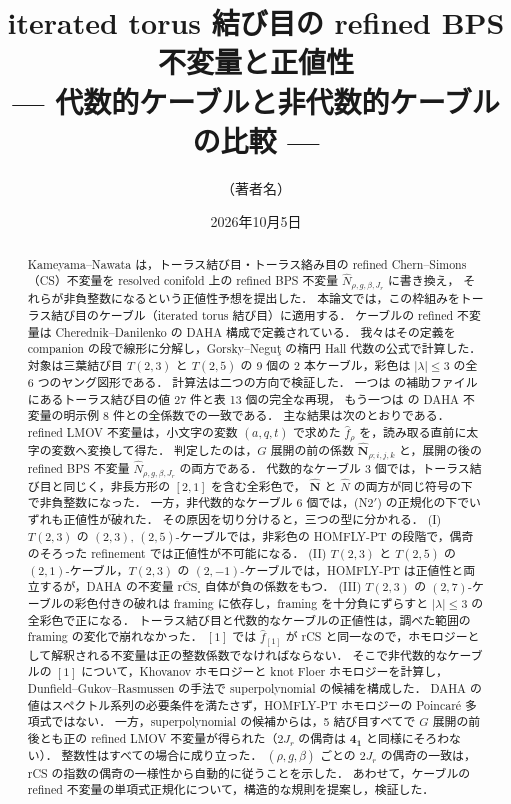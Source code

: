 \documentclass[11pt,a4paper]{ltjsarticle}
\title{iterated torus 結び目の refined BPS 不変量と正値性\\
\large --- 代数的ケーブルと非代数的ケーブルの比較 ---}
\author{（著者名）}
\date{2026年10月5日}
\theoremstyle{definition}
\theoremstyle{remark}
\newcommand{\rCS}{\overline{\mathrm{rCS}}}
\newcommand{\hN}{\widehat{N}}
\newcommand{\hf}{\widehat{f}}
\newcommand{\hbN}{\widehat{\mathbf{N}}}
\begin{document}
\maketitle

\begin{abstract}
Kameyama--Nawata \cite{KN} は，トーラス結び目・トーラス絡み目の refined Chern--Simons（CS）不変量を
resolved conifold 上の refined BPS 不変量 $\hN_{\rho,g,\beta,J_r}$ に書き換え，
それらが非負整数になるという正値性予想を提出した．
本論文では，この枠組みをトーラス結び目のケーブル（iterated torus 結び目）に適用する．
ケーブルの refined 不変量は Cherednik--Danilenko \cite{CD14} の DAHA 構成で定義されている．
我々はその定義を companion の段で線形に分解し，Gorsky--Neguţ \cite{GN} の楕円 Hall 代数の公式で計算した．
対象は三葉結び目 $T(2,3)$ と $T(2,5)$ の 9 個の 2 本ケーブル，彩色は $|\lambda|\le 3$ の全 6 つのヤング図形である．
計算法は二つの方向で検証した．
一つは \cite{KN} の補助ファイルにあるトーラス結び目の値 27 件と表 13 個の完全な再現，
もう一つは \cite{CD14} の DAHA 不変量の明示例 8 件との全係数での一致である．
主な結果は次のとおりである．
refined LMOV 不変量は，小文字の変数 $(a,q,t)$ で求めた $\hf_\rho$ を，読み取る直前に太字の変数へ変換して得た．
判定したのは，$G$ 展開の前の係数 $\hbN_{\rho;i,j,k}$ と，展開の後の refined BPS 不変量 $\hN_{\rho,g,\beta,J_r}$ の両方である．
代数的なケーブル 3 個では，トーラス結び目と同じく，非長方形の $[2,1]$ を含む全彩色で，
$\hbN$ と $\hN$ の両方が同じ符号の下で非負整数になった．
一方，非代数的なケーブル 6 個では，(N2$'$) の正規化の下でいずれも正値性が破れた．
その原因を切り分けると，三つの型に分かれる．
(I) $T(2,3)$ の $(2,3)$, $(2,5)$-ケーブルでは，非彩色の HOMFLY-PT の段階で，偶奇のそろった refinement では正値性が不可能になる．
(II) $T(2,3)$ と $T(2,5)$ の $(2,1)$-ケーブル，$T(2,3)$ の $(2,-1)$-ケーブルでは，HOMFLY-PT は正値性と両立するが，DAHA の不変量 $\rCS_\square$ 自体が負の係数をもつ．
(III) $T(2,3)$ の $(2,7)$-ケーブルの彩色付きの破れは framing に依存し，framing を十分負にずらすと $|\lambda|\le3$ の全彩色で正になる．
トーラス結び目と代数的なケーブルの正値性は，調べた範囲の framing の変化で崩れなかった．
$[1]$ では $\hf_{[1]}$ が rCS と同一なので，ホモロジーとして解釈される不変量は正の整数係数でなければならない．
そこで非代数的なケーブルの $[1]$ について，Khovanov ホモロジーと knot Floer ホモロジーを計算し，Dunfield--Gukov--Rasmussen の手法で superpolynomial の候補を構成した．
DAHA の値はスペクトル系列の必要条件を満たさず，HOMFLY-PT ホモロジーの Poincaré 多項式ではない．
一方，superpolynomial の候補からは，5 結び目すべてで $G$ 展開の前後とも正の refined LMOV 不変量が得られた（$2J_r$ の偶奇は $\mathbf{4_1}$ と同様にそろわない）．
整数性はすべての場合に成り立った．
$(\rho,g,\beta)$ ごとの $2J_r$ の偶奇の一致は，rCS の指数の偶奇の一様性から自動的に従うことを示した．
あわせて，ケーブルの refined 不変量の単項式正規化について，構造的な規則を提案し，検証した．
\end{abstract}
\end{document}
